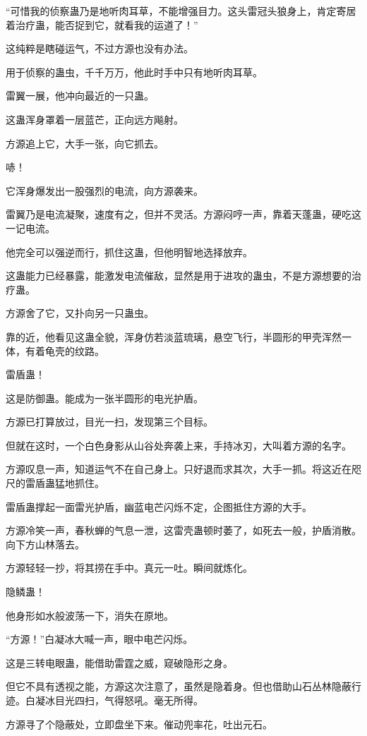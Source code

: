 \begin{this_body}
“可惜我的侦察蛊乃是地听肉耳草，不能增强目力。这头雷冠头狼身上，肯定寄居着治疗蛊，能否捉到它，就看我的运道了！”

这纯粹是瞎碰运气，不过方源也没有办法。

用于侦察的蛊虫，千千万万，他此时手中只有地听肉耳草。

雷翼一展，他冲向最近的一只蛊。

这蛊浑身罩着一层蓝芒，正向远方飚射。

方源追上它，大手一张，向它抓去。

哧！

它浑身爆发出一股强烈的电流，向方源袭来。

雷翼乃是电流凝聚，速度有之，但并不灵活。方源闷哼一声，靠着天蓬蛊，硬吃这一记电流。

他完全可以强逆而行，抓住这蛊，但他明智地选择放弃。

这蛊能力已经暴露，能激发电流催敌，显然是用于进攻的蛊虫，不是方源想要的治疗蛊。

方源舍了它，又扑向另一只蛊虫。

靠的近，他看见这蛊全貌，浑身仿若淡蓝琉璃，悬空飞行，半圆形的甲壳浑然一体，有着龟壳的纹路。

雷盾蛊！

这是防御蛊。能成为一张半圆形的电光护盾。

方源已打算放过，目光一扫，发现第三个目标。

但就在这时，一个白色身影从山谷处奔袭上来，手持冰刃，大叫着方源的名字。

方源叹息一声，知道运气不在自己身上。只好退而求其次，大手一抓。将这近在咫尺的雷盾蛊猛地抓住。

雷盾蛊撑起一面雷光护盾，幽蓝电芒闪烁不定，企图抵住方源的大手。

方源冷笑一声，春秋蝉的气息一泄，这雷壳蛊顿时萎了，如死去一般，护盾消散。向下方山林落去。

方源轻轻一抄，将其捞在手中。真元一吐。瞬间就炼化。

隐鳞蛊！

他身形如水般波荡一下，消失在原地。

“方源！”白凝冰大喊一声，眼中电芒闪烁。

这是三转电眼蛊，能借助雷霆之威，窥破隐形之身。

但它不具有透视之能，方源这次注意了，虽然是隐着身。但也借助山石丛林隐蔽行迹。白凝冰目光四扫，气得怒吼。毫无所得。

方源寻了个隐蔽处，立即盘坐下来。催动兜率花，吐出元石。


\end{this_body}
